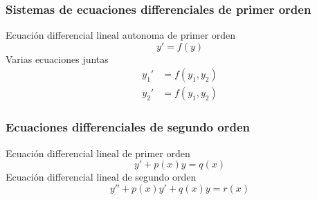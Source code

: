 \documentclass{beamer}
\begin{document}
\begin{frame}
\frametitle{Sistemas de ecuaciones differenciales de primer orden}
Ecuación differencial lineal autonoma de primer orden
\[y'=f(y)\]
Varias ecuaciones juntas
\[
\begin{aligned}
y_{1}'&=f(y_{1},y_{2}) \\
y_{2}'&=f(y_{1},y_{2})
\end{aligned}
\]


\end{frame}
\begin{frame}
\frametitle{Ecuaciones differenciales de segundo orden}
Ecuación differencial lineal de primer orden
\[y'+p(x)y=q(x)\]
Ecuación differencial lineal de segundo orden
\[y''+p(x)y'+q(x)y=r(x)\]
\end{frame}
\end{document}
